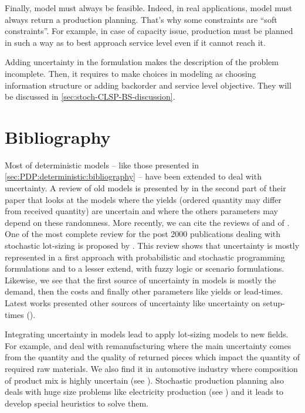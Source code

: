 Finally, model must always be feasible.
Indeed, in real applications, model must always return a production planning.
That's why some constraints are ``soft constraints''.
For example, in case of capacity issue, production must be planned in such a way as to best approach service level even if it cannot reach it.


\medskip

Adding uncertainty in the formulation makes the description of the problem incomplete.
Then, it requires to make choices in modeling as choosing information structure or adding backorder and service level objective.
They will be discussed in \cref{sec:stoch-CLSP-BS-discussion}.


\section{Bibliography}
\label{sec:PDP:stochastic:bibliography}


Most of deterministic models -- like those presented in \cref{sec:PDP:deterministic:bibliography} -- have been extended to deal with uncertainty.
A review of old models is presented by \citet{Candace1995} in the second part of their paper that looks at the models where the yields (\eg ordered quantity may differ from received quantity) are uncertain and where the others parameters may depend on these randomness.
More recently, we can cite the reviews of \citet{Mula2006} and of \citet{Diaz-Madronero2014}.
One of the most complete review for the post 2000 publications dealing with stochastic lot-sizing is proposed by \citet{Aloulou2014}.
This review shows that uncertainty is mostly represented in a first approach with probabilistic and stochastic programming formulations and to a lesser extend, with fuzzy logic or scenario formulations.
Likewise, we see that the first source of uncertainty in models is mostly the demand, then the costs and finally other parameters like yields or lead-times.
Latest works presented other sources of uncertainty like uncertainty on setup-times (\citet{Tas2018}).


Integrating uncertainty in models lead to apply lot-sizing models to new fields.
For example, \citet{Mukhopadhyay2009} and \citet{Macedo2016} deal with remanufacturing where the main uncertainty comes from the quantity and the quality of returned pieces which impact the quantity of required raw materials.
We also find it in automotive industry where composition of product mix is highly uncertain (see \citet{Gyulai2015}).
Stochastic production planning also deals with huge size problems like electricity production (see \citet{Rozenknop2013}) and it leads to develop special heuristics to solve them.



